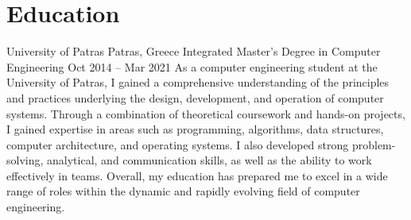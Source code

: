 \section{Education}

\begin{itemize}
    \cventry
        {University of Patras}
        {Patras, Greece}
        {Integrated Master's Degree in Computer Engineering}
        {Oct 2014 -- Mar 2021}
    \cvitem
        {As a computer engineering student at the University of Patras, I gained a comprehensive understanding of the principles and practices underlying the design, development, and operation of computer systems. Through a combination of theoretical coursework and hands-on projects, I gained expertise in areas such as programming, algorithms, data structures, computer architecture, and operating systems. I also developed strong problem-solving, analytical, and communication skills, as well as the ability to work effectively in teams. Overall, my education has prepared me to excel in a wide range of roles within the dynamic and rapidly evolving field of computer engineering.}
\end{itemize}
